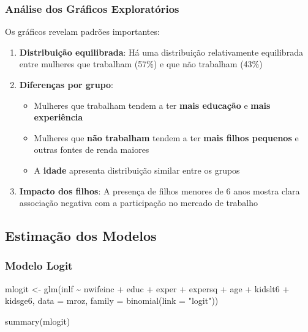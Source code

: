 \documentclass[
  letterpaper,
  DIV=11,
  numbers=noendperiod]{scrartcl}
\newenvironment{Shaded}{\begin{snugshade}}{\end{snugshade}}
\newcommand{\AttributeTok}[1]{\textcolor[rgb]{0.40,0.45,0.13}{#1}}
\newcommand{\FunctionTok}[1]{\textcolor[rgb]{0.28,0.35,0.67}{#1}}
\newcommand{\NormalTok}[1]{\textcolor[rgb]{0.00,0.23,0.31}{#1}}
\newcommand{\OtherTok}[1]{\textcolor[rgb]{0.00,0.23,0.31}{#1}}
\newcommand{\SpecialCharTok}[1]{\textcolor[rgb]{0.37,0.37,0.37}{#1}}
\newcommand{\StringTok}[1]{\textcolor[rgb]{0.13,0.47,0.30}{#1}}
\providecommand{\tightlist}{%
  \setlength{\itemsep}{0pt}\setlength{\parskip}{0pt}}\usepackage{longtable,booktabs,array}
\begin{document}
\subsubsection{Análise dos Gráficos
Exploratórios}\label{anuxe1lise-dos-gruxe1ficos-exploratuxf3rios}

Os gráficos revelam padrões importantes:

\begin{enumerate}
\def\labelenumi{\arabic{enumi}.}
\item
  \textbf{Distribuição equilibrada}: Há uma distribuição relativamente
  equilibrada entre mulheres que trabalham (57\%) e que não trabalham
  (43\%)
\item
  \textbf{Diferenças por grupo}:

  \begin{itemize}
  \tightlist
  \item
    Mulheres que trabalham tendem a ter \textbf{mais educação} e
    \textbf{mais experiência}
  \item
    Mulheres que \textbf{não trabalham} tendem a ter \textbf{mais filhos
    pequenos} e outras fontes de renda maiores
  \item
    A \textbf{idade} apresenta distribuição similar entre os grupos
  \end{itemize}
\item
  \textbf{Impacto dos filhos}: A presença de filhos menores de 6 anos
  mostra clara associação negativa com a participação no mercado de
  trabalho
\end{enumerate}

\subsection{Estimação dos Modelos}\label{estimauxe7uxe3o-dos-modelos}

\subsubsection{Modelo Logit}\label{modelo-logit-1}

\begin{Shaded}
\begin{Highlighting}[]
\NormalTok{mlogit }\OtherTok{\textless{}{-}} \FunctionTok{glm}\NormalTok{(inlf }\SpecialCharTok{\textasciitilde{}}\NormalTok{ nwifeinc }\SpecialCharTok{+}\NormalTok{ educ }\SpecialCharTok{+}\NormalTok{ exper }\SpecialCharTok{+}\NormalTok{ expersq }\SpecialCharTok{+}\NormalTok{ age }\SpecialCharTok{+}\NormalTok{ kidslt6 }\SpecialCharTok{+}\NormalTok{ kidsge6,}
              \AttributeTok{data =}\NormalTok{ mroz,}
              \AttributeTok{family =} \FunctionTok{binomial}\NormalTok{(}\AttributeTok{link =} \StringTok{"logit"}\NormalTok{))}

\FunctionTok{summary}\NormalTok{(mlogit)}
\end{Highlighting}
\end{Shaded}
\end{document}
